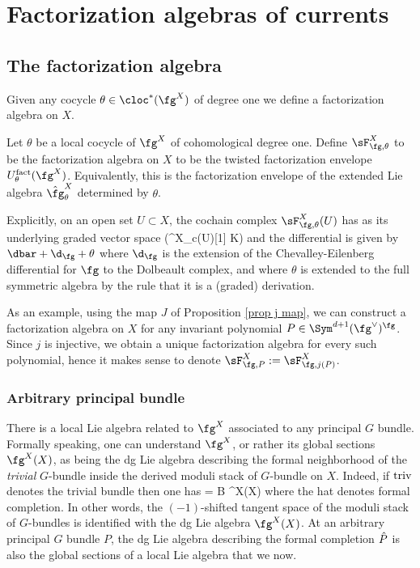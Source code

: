 \section{Factorization algebras of currents}
\label{sec: fact}

\subsection{The factorization algebra}

Given any cocycle $\theta \in \cloc^*(\fg^X)$ of degree one we define a factorization algebra on $X$. 

\begin{dfn} Let $\theta$ be a local cocycle of $\fg^X$ of cohomological degree one. Define $\sF_{\fg,\theta}^X$ to be the factorization algebra on $X$ to be the twisted factorization envelope $U^{\rm fact}_\theta (\fg^X)$. 
Equivalently, this is the factorization envelope of the extended Lie algebra $\Hat{\fg}^X_\theta$ determined by $\theta$. 
\end{dfn}

Explicitly, on an open set $U \subset X$, the cochain complex $\sF^X_{\fg,\theta}(U)$ has as its underlying graded vector space
\ben
\Sym\left(\fg^X_{c}(U)[1] \oplus \CC \cdot K\right)
\een
and the differential is given by $\dbar + \d_\fg + \theta$ where $\d_\fg$ is the extension of the Chevalley-Eilenberg differential for $\fg$ to the Dolbeault complex, and where $\theta$ is extended to the full symmetric algebra by the rule that it is a (graded) derivation. 

\begin{eg} As an example, using the map $J$ of Proposition \ref{prop j map}, we can construct a factorization algebra on $X$ for any invariant polynomial $P \in \Sym^{d+1}(\fg^\vee)^\fg$. Since $j$ is injective, we obtain a unique factorization algebra for every such polynomial, hence it makes sense to denote $\sF^X_{\fg, P} := \sF^X_{\fg,j(P)}$. 
\end{eg}

\subsubsection{Arbitrary principal bundle}

There is a local Lie algebra related to $\fg^X$ associated to any principal $G$ bundle. Formally speaking, one can understand $\fg^X$, or rather its global sections $\fg^X(X)$, as being the dg Lie algebra describing the formal neighborhood of the {\em trivial} $G$-bundle inside the derived moduli stack of $G$-bundle on $X$. Indeed, if ${\rm triv}$ denotes the trivial bundle then one has
\ben
{} = B \fg^X(X)
\een
where the hat denotes formal completion. In other words, the $(-1)$-shifted tangent space of the moduli stack of $G$-bundles is identified with the dg Lie algebra $\fg^X(X)$. At an arbitrary principal $G$ bundle $P$, the dg Lie algebra describing the formal completion $\Hat{P}$ is also the global sections of a local Lie algebra that we now. 

